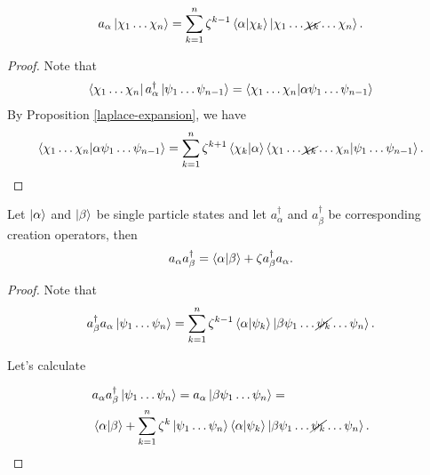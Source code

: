 \documentclass[main.tex]{subfiles}
\begin{document}
\begin{proposition}
\begin{equation}
a_\alpha \ket{\chi_1\dots\chi_n} = \sum_{k=1}^n \zeta^{k - 1} \bra{\alpha}\ket{\chi_k}\ket{\chi_1\dots\cancel{\chi_k}\dots\chi_n}.
\end{equation}
\end{proposition}
\begin{proof}
Note that
\begin{equation}
\bra{\chi_1\dots\chi_{n}} a^\dagger_\alpha \ket{\psi_1\dots\psi_{n-1}} 
= \bra{\chi_1\dots\chi_{n}} \ket{\alpha \psi_1\dots\psi_{n-1}}
\end{equation}
By Proposition \ref{laplace-expansion}, we have
\begin{equation}
\bra{\chi_1\dots\chi_{n}} \ket{\alpha \psi_1\dots\psi_{n-1}} = \sum_{k=1}^n \zeta^{k + 1} \bra{\chi_k}\ket{\alpha} \bra{\chi_1\dots\cancel{\chi_k}\dots\chi_{n}}\ket{ \psi_1\dots\psi_{n-1}}.
\end{equation}
\end{proof}
\begin{proposition}
Let $\ket{\alpha}$ and $\ket{\beta}$ be single particle states and let $a^\dagger_{\alpha}$ and $a^\dagger_{\beta}$ be corresponding creation operators, then
\begin{equation}
a_\alpha a^\dagger_\beta = \bra{\alpha}\ket{\beta} + \zeta a^\dagger_\beta a_\alpha.
\end{equation}
\end{proposition}
\begin{proof}
Note that
\begin{equation}
a^\dagger_\beta a_\alpha \ket{\psi_1\dots\psi_n} = \sum_{k=1}^n \zeta^{k - 1} \bra{\alpha}\ket{\psi_k}\ket{\beta \psi_1\dots\cancel{\psi_k}\dots\psi_n}.
\end{equation}

Let's calculate

\begin{align*}
& a_\alpha a^\dagger_\beta \ket{\psi_1\dots\psi_n} = a_\alpha \ket{\beta \psi_1\dots\psi_n} = \\
& \bra{\alpha}\ket{\beta} 
+ \sum_{k=1}^n \zeta^k \ket{\psi_1\dots\psi_n} \bra{\alpha}\ket{\psi_k}\ket{\beta \psi_1\dots\cancel{\psi_k}\dots\psi_n}.
\end{align*}
\end{proof}
\end{document}
